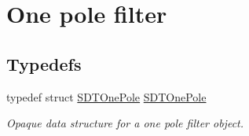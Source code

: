 \hypertarget{group__onepole}{}\section{One pole filter}
\label{group__onepole}
\subsection*{Typedefs}
\begin{DoxyCompactItemize}
\item 
\hypertarget{group__onepole_gaf029661adfbccd326c286c801bfcdd01}{}typedef struct \hyperlink{group__onepole_gaf029661adfbccd326c286c801bfcdd01}{S\+D\+T\+One\+Pole} \hyperlink{group__onepole_gaf029661adfbccd326c286c801bfcdd01}{S\+D\+T\+One\+Pole}\label{group__onepole_gaf029661adfbccd326c286c801bfcdd01}

\begin{DoxyCompactList}\small\item\em Opaque data structure for a one pole filter object. \end{DoxyCompactList}\end{DoxyCompactItemize}
